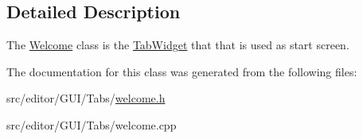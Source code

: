 \subsection{\-Detailed \-Description}
\-The \hyperlink{class_welcome}{\-Welcome} class is the \hyperlink{class_tab_widget}{\-Tab\-Widget} that that is used as start screen. 

\-The documentation for this class was generated from the following files\-:\begin{DoxyCompactItemize}
\item 
src/editor/\-G\-U\-I/\-Tabs/\hyperlink{welcome_8h}{welcome.\-h}\item 
src/editor/\-G\-U\-I/\-Tabs/welcome.\-cpp\end{DoxyCompactItemize}
